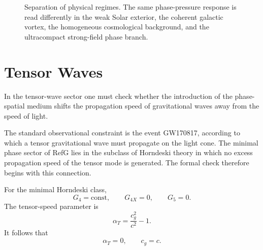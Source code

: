 \documentclass[12pt]{article}
\begin{document}
\begin{figure}[t]
\centering
{}
\caption{Separation of physical regimes. The same phase-pressure response is read differently in the weak Solar exterior, the coherent galactic vortex, the homogeneous cosmological background, and the ultracompact strong-field phase branch.}
\label{fig:regime-map}
\end{figure}

\section{Tensor Waves}

In the tensor-wave sector one must check whether the introduction of the phase-spatial medium shifts the propagation speed of gravitational waves away from the speed of light.

The standard observational constraint is the event GW170817, according to which a tensor gravitational wave must propagate on the light cone. The minimal phase sector of RefG lies in the subclass of Horndeski theory in which no excess propagation speed of the tensor mode is generated. The formal check therefore begins with this connection.

For the minimal Horndeski class,
\begin{equation}
G_4=\mathrm{const},\qquad G_{4X}=0,\qquad G_5=0 .
\end{equation}
The tensor-speed parameter is
\begin{equation}
\alpha_T=\frac{c_g^2}{c^2}-1 .
\end{equation}
It follows that
\begin{equation}
\alpha_T=0,\qquad c_g=c .
\end{equation}
\end{document}
